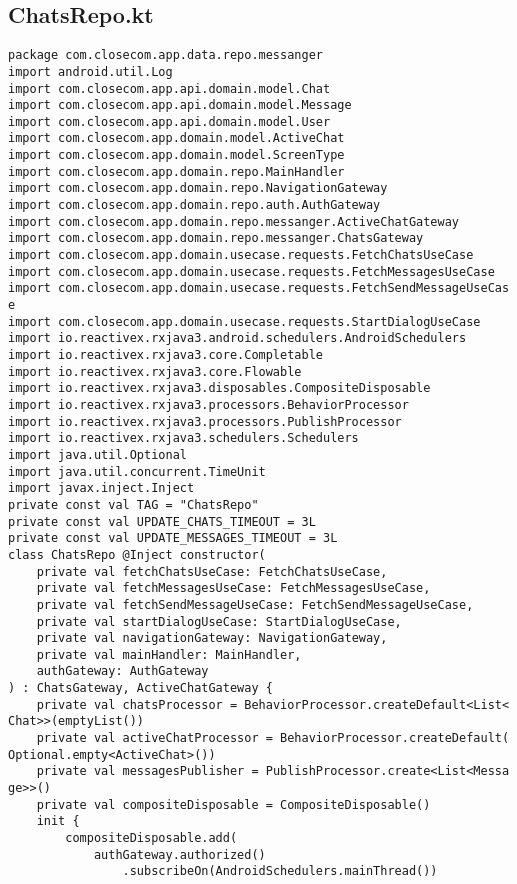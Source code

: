 \documentclass[listing]{espd}
\begin{document}
\subsection{ChatsRepo.kt}
\begin{verbatim}
package com.closecom.app.data.repo.messanger
import android.util.Log
import com.closecom.app.api.domain.model.Chat
import com.closecom.app.api.domain.model.Message
import com.closecom.app.api.domain.model.User
import com.closecom.app.domain.model.ActiveChat
import com.closecom.app.domain.model.ScreenType
import com.closecom.app.domain.repo.MainHandler
import com.closecom.app.domain.repo.NavigationGateway
import com.closecom.app.domain.repo.auth.AuthGateway
import com.closecom.app.domain.repo.messanger.ActiveChatGateway
import com.closecom.app.domain.repo.messanger.ChatsGateway
import com.closecom.app.domain.usecase.requests.FetchChatsUseCase
import com.closecom.app.domain.usecase.requests.FetchMessagesUseCase
import com.closecom.app.domain.usecase.requests.FetchSendMessageUseCas
e
import com.closecom.app.domain.usecase.requests.StartDialogUseCase
import io.reactivex.rxjava3.android.schedulers.AndroidSchedulers
import io.reactivex.rxjava3.core.Completable
import io.reactivex.rxjava3.core.Flowable
import io.reactivex.rxjava3.disposables.CompositeDisposable
import io.reactivex.rxjava3.processors.BehaviorProcessor
import io.reactivex.rxjava3.processors.PublishProcessor
import io.reactivex.rxjava3.schedulers.Schedulers
import java.util.Optional
import java.util.concurrent.TimeUnit
import javax.inject.Inject
private const val TAG = "ChatsRepo"
private const val UPDATE_CHATS_TIMEOUT = 3L
private const val UPDATE_MESSAGES_TIMEOUT = 3L
class ChatsRepo @Inject constructor(
    private val fetchChatsUseCase: FetchChatsUseCase,
    private val fetchMessagesUseCase: FetchMessagesUseCase,
    private val fetchSendMessageUseCase: FetchSendMessageUseCase,
    private val startDialogUseCase: StartDialogUseCase,
    private val navigationGateway: NavigationGateway,
    private val mainHandler: MainHandler,
    authGateway: AuthGateway
) : ChatsGateway, ActiveChatGateway {
    private val chatsProcessor = BehaviorProcessor.createDefault<List<
Chat>>(emptyList())
    private val activeChatProcessor = BehaviorProcessor.createDefault(
Optional.empty<ActiveChat>())
    private val messagesPublisher = PublishProcessor.create<List<Messa
ge>>()
    private val compositeDisposable = CompositeDisposable()
    init {
        compositeDisposable.add(
            authGateway.authorized()
                .subscribeOn(AndroidSchedulers.mainThread())

\end{verbatim}
\end{document}
